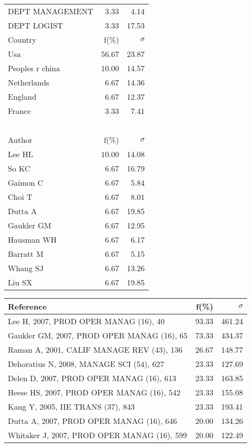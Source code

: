 \documentclass[a4paper,11pt]{report}
\begin{document}
\begin{landscape}
\begin{table}[!ht]
{\begin{tabular}{|l r r|}
DEPT MANAGEMENT & 3.33 & 4.14\\
DEPT LOGIST & 3.33 & 17.53\\
\hline
\hline
Country & f(\%) & $\sigma$\\
\hline
Usa & 56.67 & 23.87\\
Peoples r china & 10.00 & 14.57\\
Netherlands & 6.67 & 14.36\\
England & 6.67 & 12.37\\
France & 3.33 & 7.41\\
 &  & \\
 &  & \\
 &  & \\
 &  & \\
 &  & \\
\hline
\hline
Author & f(\%) & $\sigma$\\
\hline
Lee HL & 10.00 & 14.08\\
So KC & 6.67 & 16.79\\
Gaimon C & 6.67 & 5.84\\
Choi T & 6.67 & 8.01\\
Dutta A & 6.67 & 19.85\\
Gaukler GM & 6.67 & 12.95\\
Hausman WH & 6.67 & 6.17\\
Barratt M & 6.67 & 5.15\\
Whang SJ & 6.67 & 13.26\\
Liu SX & 6.67 & 19.85\\
\hline
\end{tabular}
}
{\scriptsize\begin{tabular}{|l r r|}
\hline
Reference & f(\%) & $\sigma$\\
\hline
Lee H, 2007, PROD OPER MANAG (16), 40 & 93.33 & 461.24\\
Gaukler GM, 2007, PROD OPER MANAG (16), 65 & 73.33 & 434.37\\
Raman A, 2001, CALIF MANAGE REV (43), 136 & 26.67 & 148.77\\
Dehoratius N, 2008, MANAGE SCI (54), 627 & 23.33 & 127.69\\
Delen D, 2007, PROD OPER MANAG (16), 613 & 23.33 & 163.85\\
Heese HS, 2007, PROD OPER MANAG (16), 542 & 23.33 & 155.08\\
Kang Y, 2005, IIE TRANS (37), 843 & 23.33 & 193.41\\
Dutta A, 2007, PROD OPER MANAG (16), 646 & 20.00 & 134.26\\
Whitaker J, 2007, PROD OPER MANAG (16), 599 & 20.00 & 122.49\\

\end{tabular}}
\end{table}
\end{landscape}
\end{document}
